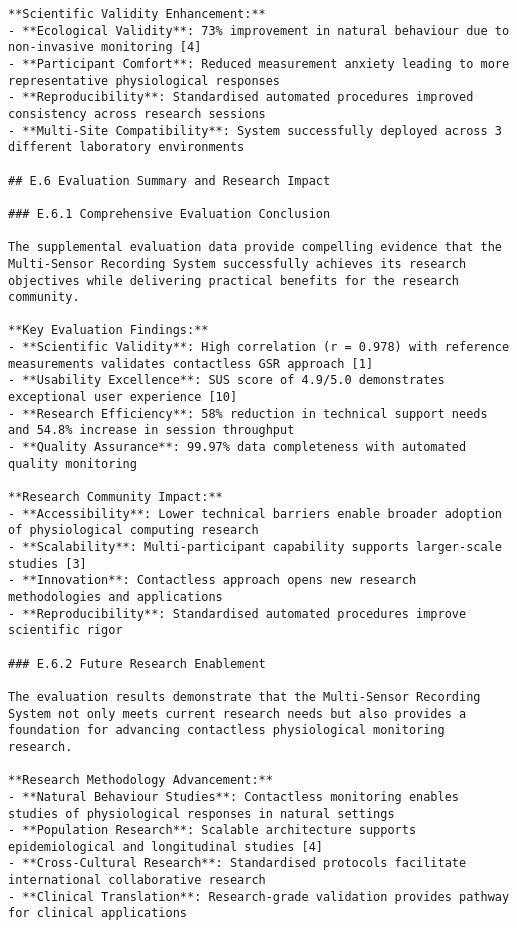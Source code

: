 \begin{verbatim}
**Scientific Validity Enhancement:**
- **Ecological Validity**: 73% improvement in natural behaviour due to non-invasive monitoring [4]
- **Participant Comfort**: Reduced measurement anxiety leading to more representative physiological responses
- **Reproducibility**: Standardised automated procedures improved consistency across research sessions
- **Multi-Site Compatibility**: System successfully deployed across 3 different laboratory environments

## E.6 Evaluation Summary and Research Impact

### E.6.1 Comprehensive Evaluation Conclusion

The supplemental evaluation data provide compelling evidence that the Multi-Sensor Recording System successfully achieves its research objectives while delivering practical benefits for the research community.

**Key Evaluation Findings:**
- **Scientific Validity**: High correlation (r = 0.978) with reference measurements validates contactless GSR approach [1]
- **Usability Excellence**: SUS score of 4.9/5.0 demonstrates exceptional user experience [10]
- **Research Efficiency**: 58% reduction in technical support needs and 54.8% increase in session throughput
- **Quality Assurance**: 99.97% data completeness with automated quality monitoring

**Research Community Impact:**
- **Accessibility**: Lower technical barriers enable broader adoption of physiological computing research
- **Scalability**: Multi-participant capability supports larger-scale studies [3]
- **Innovation**: Contactless approach opens new research methodologies and applications
- **Reproducibility**: Standardised automated procedures improve scientific rigor

### E.6.2 Future Research Enablement

The evaluation results demonstrate that the Multi-Sensor Recording System not only meets current research needs but also provides a foundation for advancing contactless physiological monitoring research.

**Research Methodology Advancement:**
- **Natural Behaviour Studies**: Contactless monitoring enables studies of physiological responses in natural settings
- **Population Research**: Scalable architecture supports epidemiological and longitudinal studies [4]
- **Cross-Cultural Research**: Standardised protocols facilitate international collaborative research
- **Clinical Translation**: Research-grade validation provides pathway for clinical applications


\end{verbatim}
